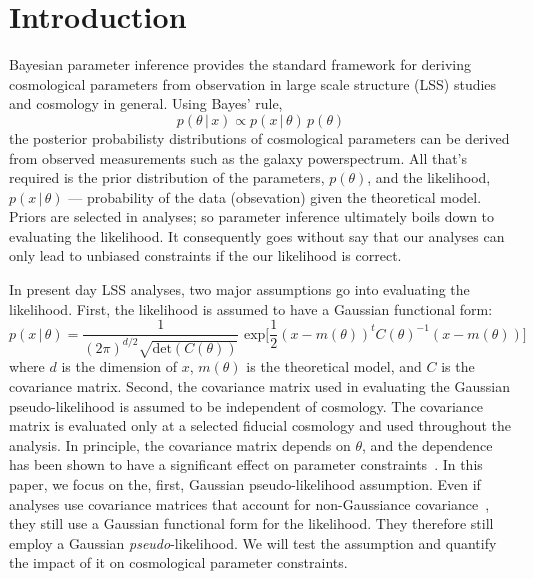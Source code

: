 \documentclass[12pt, letterpaper, preprint]{aastex}
\newcommand{\beq}{\begin{equation}}
\newcommand{\eeq}{\end{equation}}
\begin{document}
\section{Introduction}
Bayesian parameter inference provides the standard framework for 
deriving cosmological parameters from observation in large scale 
structure (LSS) studies and cosmology in general. 
Using Bayes' rule, 
\beq
p( \theta\,|\,x) \propto p( x\,|\,\theta) \, p(\theta)
\eeq
the posterior probabilisty distributions of cosmological parameters
can be derived from observed measurements such as the galaxy 
powerspectrum. All that's required is the prior distribution of the 
parameters, $p(\theta)$, and the likelihood, $p( x\,|\,\theta)$ --- 
probability of the data (obsevation) given the theoretical model.
Priors are selected in analyses; so parameter inference ultimately 
boils down to evaluating the likelihood. It consequently goes without 
say that our analyses can only lead to unbiased constraints if the our 
likelihood is correct. 

In present day LSS analyses, two major assumptions go into evaluating the 
likelihood. First, the likelihood is assumed to have a Gaussian functional 
form: 
\beq
p(x\,|\,\theta) = \frac{1}{(2\pi)^{d/2} \sqrt{\mathrm{det}(C(\theta))}}\,\,\mathrm{exp}\bigg[\frac{1}{2}(x - m(\theta))^{t} C(\theta)^{-1} (x - m(\theta))\bigg]
\eeq
where $d$ is the dimension of $x$, $m(\theta)$ is the theoretical model, and $C$ 
is the covariance matrix. Second, the covariance matrix used in evaluating the Gaussian pseudo-likelihood
is assumed to be independent of cosmology. The covariance matrix is 
evaluated only at a selected fiducial cosmology and used throughout 
the analysis. In principle, the covariance matrix depends on $\theta$, 
and the dependence has been shown to have a significant effect 
on parameter constraints~\citep[\emph{e.g.}][]{eifler2009, morrison2013, white2015}. 
In this paper, we focus on the, first, Gaussian pseudo-likelihood assumption. 
Even if analyses use covariance matrices 
that account for non-Gaussiance covariance~\citep[\emph{e.g.}][]{scoccimarro1999, hu2001, oconnell2016}, 
they still use a Gaussian functional form for the likelihood. They 
therefore still employ a Gaussian \emph{pseudo}-likelihood. 
We will test the assumption and quantify the impact of it on cosmological 
parameter constraints. 
\end{document}
